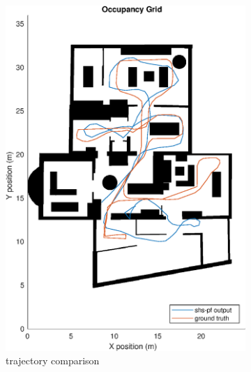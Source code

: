 \begin{figure}[H]
	\centering
	\begin{subfigure}[t]{.45\textwidth}
		\centering
		\includegraphics[width=0.9\linewidth]{images/20201107_1338_trial2_Occupancy_Grid}
		\caption{trajectory comparison}
		\label{fig:shspf_trial2_on_map}
	\end{subfigure}
	\begin{subfigure}[t]{.45\textwidth}
		\centering

\end{subfigure}
\end{figure}
